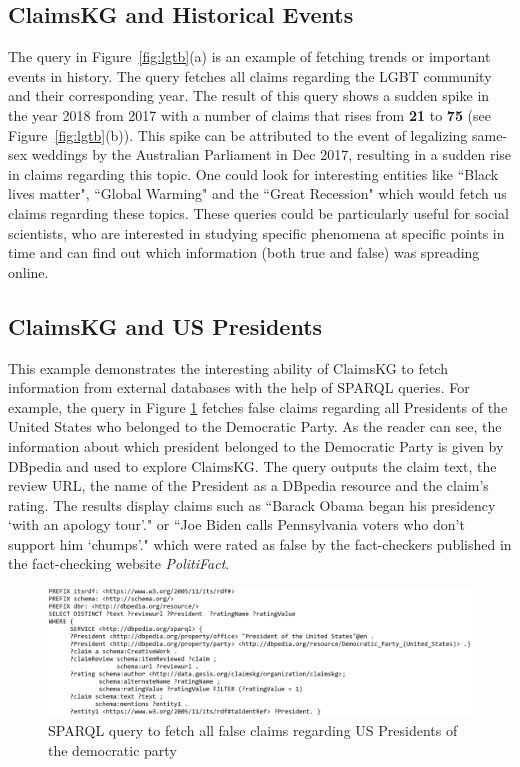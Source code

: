\documentclass[
]{ceurart}
\begin{document}
\vspace{-1mm}
\subsection{ClaimsKG and Historical Events}
\vspace{-2mm}

The query in Figure~\ref{fig:lgtb}(a) is an example of fetching trends or important events in history. The query fetches all claims regarding the LGBT community and their corresponding year. The result of this query shows a sudden spike in the year 2018 from 2017 with a number of claims that rises from \textbf{21} to \textbf{75} (see Figure~\ref{fig:lgtb}(b)). This spike can be attributed to the event of legalizing same-sex weddings by the Australian Parliament in Dec 2017, resulting in a sudden rise in claims regarding this topic. %
One could look for interesting entities like ``Black lives matter", ``Global Warming"  and the ``Great Recession" which would fetch us claims regarding these topics. These queries could be particularly useful for social scientists, who are interested in studying specific phenomena at specific points in time and can find out which information (both true and false) was spreading online.
\vspace{-4mm}


\subsection{ClaimsKG and US Presidents}
\vspace{-2mm}
This example demonstrates the interesting ability of ClaimsKG to fetch information from external databases with the help of SPARQL queries. For example, the query in Figure \ref{Table6} fetches false claims regarding all Presidents of the United States who belonged to the Democratic Party. As the reader can see, the information about which president belonged to the Democratic Party is given by DBpedia and used to explore ClaimsKG. The query outputs the claim text, the review URL, the name of the President as a DBpedia resource and the claim's rating. The results display claims such as ``Barack Obama began his presidency \lq{}with an apology tour\rq{}." or  ``Joe Biden calls Pennsylvania voters who don’t support him \lq{}chumps\rq{}." which were rated as false by the fact-checkers published in the fact-checking website \textit{PolitiFact}.
\vspace{-4mm}
\begin{figure}[t]
\centering
\includegraphics[width=0.7\linewidth]{table6.PNG}
\caption{SPARQL query to fetch all false claims regarding US Presidents of the democratic party}
\label{Table6}
\vspace{-4mm}
\end{figure}
\end{document}

